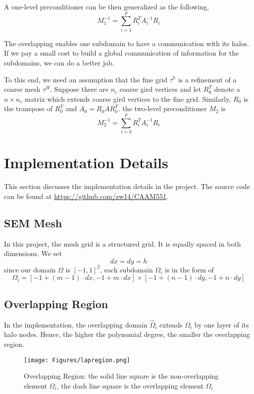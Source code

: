 \documentclass[paper=a4, fontsize=11pt]{scrartcl} %
\begin{document}
A one-level preconditioner can be then generalized as the following,
\begin{equation}
M_1^{-1}  = \sum_{i=1}^p R_i^T A_i^{-1} R_i
\end{equation}


The overlapping enables one subdomain to have a communication with its
halos. If we pay a small cost to build a global communication of
information for the subdomains, we can do a better job.

To this end, we need an assumption that the fine grid $\tau^h$ is a
refinement of a coarse mesh $\tau^H$. Suppose there are $n_c$ coarse
gird vertices and let $R_0^T$ denote a $n \times n_c$ matrix
which extends coarse gird vertices to the fine grid. Similarly,
 $R_0$ is the transpose of $R_0^T$ and $A_0 = R_0AR_0^T$. the
two-level preconditioner $M_2$ is
\begin{equation}
M_2^{-1} = \sum_{i=0}^pR_i^TA_i^{-1}R_i
\end{equation}

\section{Implementation Details}

This section discusses the implementation details in the project. The
source code can be found at \url{https://github.com/zw14/CAAM551}.

\subsection{SEM Mesh}

In this project, the mesh grid is a structured grid. It is equally
spaced in both dimensions. We set
\begin{equation}
dx = dy = h
\end{equation}
since our domain $\Omega$ is $[-1,1]^2$, each subdomain $\Omega_i$ is
in the form of
\begin{equation}
\Omega_i = [-1+(m-1)\cdot dx, -1+m \cdot dx] \times [-1+(n-1)\cdot dy, -1+n \cdot dy]
\end{equation}

\subsection{Overlapping Region}

In the implementation, the overlapping domain $\hat{\Omega}_i$
extends $\Omega_i$ by one layer of its halo nodes. Hence, the higher
the polynomial degree, the smaller the overlapping region.
\begin{figure}[H]
	\centering
        \texttt{[image: Figures/lapregion.png]}
        \caption[Overlapping Region]{Overlapping Region: the solid
          line square is the non-overlapping element $\Omega_i$, the dash
      line square is the overlapping element $\hat{\Omega}_i$}
	\label{lapregion}
\end{figure}
\end{document}
